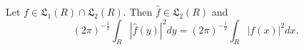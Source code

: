 Let $f \in \mathfrak{L}_1(R) \cap \mathfrak{L}_2(R)$. Then $\hat{f} \in \mathfrak{L}_2(R)$ and
$$(2\pi)^{-\frac{1}{2}} \int_R |\hat{f}(y)|^2 dy = (2\pi)^{-\frac{1}{2}} \int_R |f(x)|^2 dx.$$
